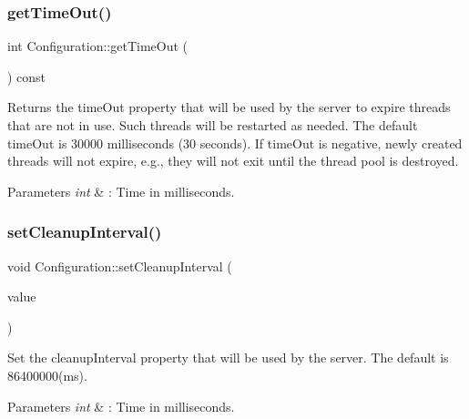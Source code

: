 \subsubsection{\texorpdfstring{get\+Time\+Out()}{getTimeOut()}}
{\footnotesize\ttfamily int Configuration\+::get\+Time\+Out (\begin{DoxyParamCaption}{ }\end{DoxyParamCaption}) const}



Returns the time\+Out property that will be used by the server to expire threads that are not in use. Such threads will be restarted as needed. The default time\+Out is 30000 milliseconds (30 seconds). If time\+Out is negative, newly created threads will not expire, e.\+g., they will not exit until the thread pool is destroyed. 


\begin{DoxyParams}{Parameters}
{\em int} & \+: Time in milliseconds. \\
\hline
\end{DoxyParams}
\mbox{\label{class_configuration_a5d6a822ffd2c3c029ae1864f8358a592}} 
\subsubsection{\texorpdfstring{set\+Cleanup\+Interval()}{setCleanupInterval()}}
{\footnotesize\ttfamily void Configuration\+::set\+Cleanup\+Interval (\begin{DoxyParamCaption}\item[{int}]{value }\end{DoxyParamCaption})}



Set the cleanup\+Interval property that will be used by the server. The default is 86400000(ms). 


\begin{DoxyParams}{Parameters}
{\em int} & \+: Time in milliseconds. \\
\hline
\end{DoxyParams}
\mbox{\label{class_configuration_af31a608106ec376f01acc028ccb09cb8}} 
